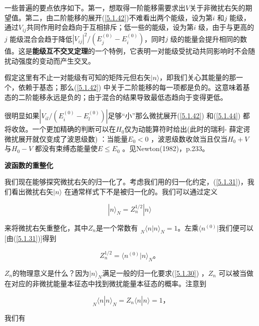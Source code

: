 ﻿\documentclass[UTF8,twoside]{ctexart}
\begin{document}
一些普遍的要点依序如下。第一，想取得一阶能移需要求出$V$关于非微扰右矢的期望值。第二，由二阶能移的展开(\ref{5.1.42})不难看出两个能级，设为第$i$ 和$j$ 能级，通过$V_{ij}$共同作用时会趋向于互相排斥；低一些的能级，设为第$i$ 级，由于与更高的$j$ 能级混合会趋于降低$|V_{ij}|^2/(E_j^{(0)}-E_i^{(0)})$，同时$j$ 级的能量会提升相同的数值。这是{\textbf{能级互不交叉定理}}的一个特例，它表明一对能级受扰动共同影响时不会随扰动强度的变动而产生交叉。

假定这里有不止一对能级有可知的矩阵元但右矢$|n\rangle$，即我们关心其能量的那一个，依赖于基态；那么(\ref{5.1.42}) 中关于二阶能移的每一项都是负的。这意味着基态的二阶能移永远是负的；由于混合的结果导致最低态趋向于变得更低。

很明显如果$|V_{il}/(E_i^{(0)}-E_l^{(0)})|$足够“小”那么微扰展开(\ref{5.1.42}) 和(\ref{5.1.44}) 都将收敛。一个更加精确的判断可以在$H_0$仅为动能算符时给出(此时的瑞利- 薛定谔微扰展开就仅变成了波恩级数) ：当能量$E_0<0$ ，波恩级数收敛当且仅当$H_0+V$ 与$H_0-V$ 都没有束缚态能量使$E\leq E_0$ 。见Newton(1982)，p.233。

\noindent \textbf{波函数的重整化}

\noindent 我们现在能够探究微扰右矢的归一化了。考虑我们用的归一化约定，(\ref{5.1.31})，我们看出微扰右矢$|n\rangle$ 在通常样式下不是被归一化的。我们可以通过定义

\begin{equation} \label{5.1.45}
|n\rangle_N = Z_n^{1/2}|n\rangle
\end{equation}

\noindent 来将微扰右矢重整化，其中$Z_n$是一个常数有$\phantom{\rangle}_N\langle n|n\rangle_N = 1$。左乘$\langle n^{(0)}|$我们便可以[由(\ref{5.1.31})]得到

\begin{equation} \label{5.1.46}
Z_n^{1/2} = \langle n^{(0)}|n\rangle_N\text{。}
\end{equation}

\noindent $Z_n$的物理意义是什么？因为$|n\rangle_N$满足一般的归一化要求(\ref{5.1.30}) ，$Z_n$ 可以被当做在对应的非微扰能量本征态中找到微扰能量本征态的概率。注意到

\begin{equation} \label{5.1.47}
\phantom{\rangle}_N\langle n|n\rangle_N = Z_n\langle n|n\rangle = 1\text{，}
\end{equation}

\noindent 我们有
\end{document}
